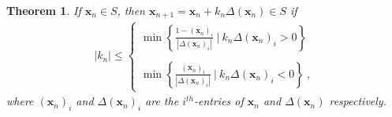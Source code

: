 \documentclass[preprint,11pt,authoryear]{elsarticle}
\newtheorem{theorem}{Theorem}%
\begin{document}
\begin{theorem}\label{normrest}
If $\mathbf{x}_n \in S$, then $\mathbf{x}_{n+1}=\mathbf{x}_n+k_n\Delta(\mathbf{x}_n) \in S$ if 
\begin{eqnarray*}
|k_n| \le \left\{\begin{array}{l} \min \left \{ \frac{1-(\mathbf{x}_n)_i}{ |\Delta(\mathbf{x}_n)_i | }  \ | \ k_n\Delta(\mathbf{x}_n)_i >0  \right  \} \\ \\
 \min \left \{ \frac{(\mathbf{x}_n)_i}{ |\Delta(\mathbf{x}_n)_i| }  \ | \ k_n\Delta(\mathbf{x}_n)_i <0  \right  \} \ ,
\end{array}
\right.
\end{eqnarray*}
where $(\mathbf{x}_n)_i$ and $\Delta(\mathbf{x}_n)_i$ are the $i^{th}$-entries of $\mathbf{x}_n$ and $\Delta(\mathbf{x}_n)$ respectively.
\end{theorem}
\end{document}
